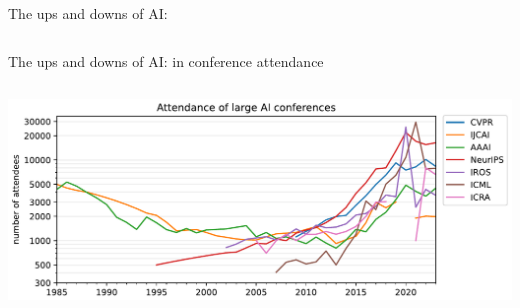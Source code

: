 \documentclass[aspectratio=169]{beamer}
\begin{document}
\begin{frame}{The ups and downs of AI: }
\vspace{0.2 cm}
\begin{columns}
\end{columns}
\end{frame}

\begin{frame}{The ups and downs of AI: in conference attendance}
\vspace{0.5 cm}
\begin{columns}
\includegraphics[width=\linewidth]{img/AI-conference-attendance.pdf}
\end{columns}
\end{frame}
\end{document}
